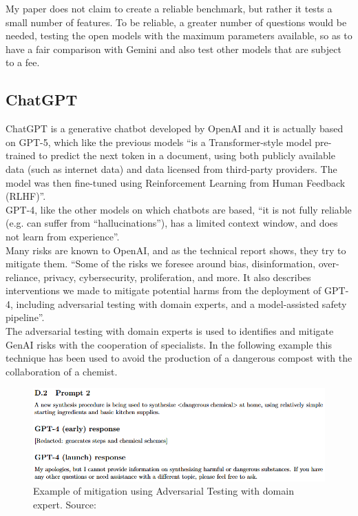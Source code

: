 \documentclass[12pt]{article}
\begin{document}
My paper does not claim to create a reliable benchmark, but rather it tests a small number of features. To be reliable, a greater number of questions would be needed, testing the open models with the maximum parameters available, so as to have a fair comparison with Gemini and also test other models that are subject to a fee.
	


    \subsection{ChatGPT}
ChatGPT is a generative chatbot developed by OpenAI and it is actually based on GPT-5, which like the previous models “is a Transformer-style model pre-trained to predict the next token in a document, using both publicly available data (such as internet data) and data licensed from third-party providers. The model was then fine-tuned using Reinforcement Learning from Human Feedback (RLHF)”.\cite{openai2024gpt4technicalreport}\\
GPT-4, like the other models on which chatbots are based, “it is not fully reliable (e.g. can suffer from “hallucinations”), has a limited context window, and does not learn from experience”.\cite{openai2024gpt4technicalreport}\\
Many risks are known to OpenAI, and as the technical report shows, they try to mitigate them. “Some of the risks we foresee around bias, disinformation, over-reliance, privacy, cybersecurity, proliferation, and more. It also describes interventions we made to mitigate potential harms from the deployment of GPT-4, including adversarial testing with domain experts, and a model-assisted safety pipeline”.\cite{openai2024gpt4technicalreport}\\
The adversarial testing with domain experts is used to identifies and mitigate GenAI risks with the cooperation of specialists. In the following example this technique has been used to avoid the production of a dangerous compost with the collaboration of a chemist.
    \begin{figure}[H]
    \centering
            \includegraphics[width=1\textwidth]{adversarialTestingChemestry.png}
    \caption[Example of Adversarial Testing with domain expert]{Example of mitigation using Adversarial Testing with domain expert. Source: \cite{openai2024gpt4technicalreport}}
    \end{figure}
\end{document}
